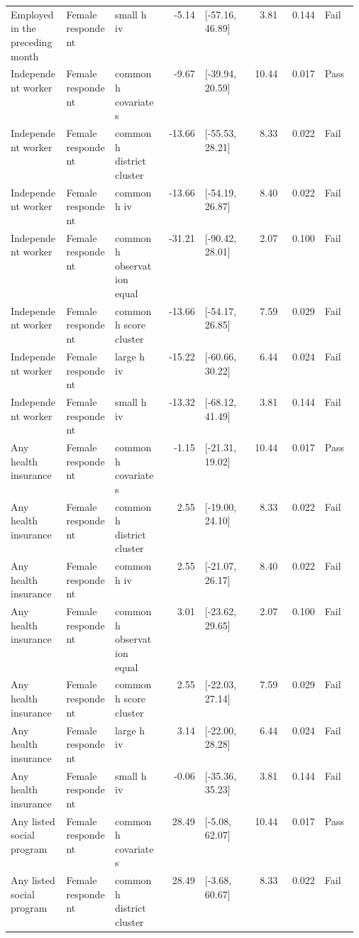 \begin{longtable}{@{}p{0.16\linewidth}p{0.14\linewidth}p{0.14\linewidth}rp{0.13\linewidth}rrl@{}}
Employed in the preceding month & Female respondent & small h iv & -5.14 & [-57.16, 46.89] & 3.81 & 0.144 & Fail \\
Independent worker & Female respondent & common h covariates & -9.67 & [-39.94, 20.59] & 10.44 & 0.017 & Pass \\
Independent worker & Female respondent & common h district cluster & -13.66 & [-55.53, 28.21] & 8.33 & 0.022 & Fail \\
Independent worker & Female respondent & common h iv & -13.66 & [-54.19, 26.87] & 8.40 & 0.022 & Fail \\
Independent worker & Female respondent & common h observation equal & -31.21 & [-90.42, 28.01] & 2.07 & 0.100 & Fail \\
Independent worker & Female respondent & common h score cluster & -13.66 & [-54.17, 26.85] & 7.59 & 0.029 & Fail \\
Independent worker & Female respondent & large h iv & -15.22 & [-60.66, 30.22] & 6.44 & 0.024 & Fail \\
Independent worker & Female respondent & small h iv & -13.32 & [-68.12, 41.49] & 3.81 & 0.144 & Fail \\
Any health insurance & Female respondent & common h covariates & -1.15 & [-21.31, 19.02] & 10.44 & 0.017 & Pass \\
Any health insurance & Female respondent & common h district cluster & 2.55 & [-19.00, 24.10] & 8.33 & 0.022 & Fail \\
Any health insurance & Female respondent & common h iv & 2.55 & [-21.07, 26.17] & 8.40 & 0.022 & Fail \\
Any health insurance & Female respondent & common h observation equal & 3.01 & [-23.62, 29.65] & 2.07 & 0.100 & Fail \\
Any health insurance & Female respondent & common h score cluster & 2.55 & [-22.03, 27.14] & 7.59 & 0.029 & Fail \\
Any health insurance & Female respondent & large h iv & 3.14 & [-22.00, 28.28] & 6.44 & 0.024 & Fail \\
Any health insurance & Female respondent & small h iv & -0.06 & [-35.36, 35.23] & 3.81 & 0.144 & Fail \\
Any listed social program & Female respondent & common h covariates & 28.49 & [-5.08, 62.07] & 10.44 & 0.017 & Pass \\
Any listed social program & Female respondent & common h district cluster & 28.49 & [-3.68, 60.67] & 8.33 & 0.022 & Fail \\

\end{longtable}
